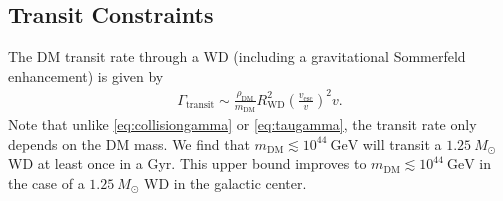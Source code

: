 \documentclass[twocolumn,showpacs,preprintnumbers,amsmath,amssymb,prd]{revtex4}
\newcommand{\GeV}{\text{GeV}}
\def\r{\right)}
\def\l{\left(}
\begin{document}
\subsection{Transit Constraints}
\label{sec:TransitConstraints}

The DM transit rate through a WD (including a gravitational Sommerfeld enhancement) is given by
\begin{align}
\Gamma_\text{transit} \sim \frac{\rho_{\text{DM}}}{m_\text{DM}} R_\text{WD}^2 \l\frac{v_\text{esc}}{v}\r^2 v.
\label{eq:TransitFluxCondition}
\end{align}
Note that unlike \eqref{eq:collisiongamma} or \eqref{eq:taugamma}, the transit rate only depends on the DM mass.
We find that $m_\text{DM} \lesssim 10^{44} ~\GeV$ will transit a $1.25 ~M_{\odot}$ WD at least once in a Gyr.
This upper bound improves to $m_\text{DM} \lesssim 10^{44} ~\GeV$ in the case of a $1.25 ~M_{\odot}$ WD in the galactic center.
\end{document}
